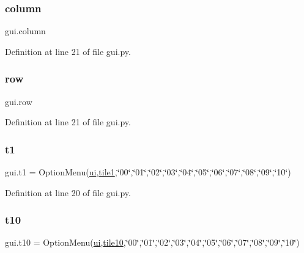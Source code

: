 \subsubsection{\texorpdfstring{column}{column}}
{\footnotesize\ttfamily gui.\+column}



Definition at line 21 of file gui.\+py.

\mbox{\label{namespacegui_a783954bf6031f175ef0ddae4ac1dd3dc}} 
\subsubsection{\texorpdfstring{row}{row}}
{\footnotesize\ttfamily gui.\+row}



Definition at line 21 of file gui.\+py.

\mbox{\label{namespacegui_a4f22ad928dc308fc066844b0a34b8ae7}} 
\subsubsection{\texorpdfstring{t1}{t1}}
{\footnotesize\ttfamily gui.\+t1 = Option\+Menu(\mbox{\hyperlink{namespacegui_a40ab7281456eadbea2dc2038f5c24fa1}{ui}},\mbox{\hyperlink{namespacegui_a50ef8346e02b4fb74cc1f3c01cc5327a}{tile1}},\char`\"{}00\char`\"{},\char`\"{}01\char`\"{},\char`\"{}02\char`\"{},\char`\"{}03\char`\"{},\char`\"{}04\char`\"{},\char`\"{}05\char`\"{},\char`\"{}06\char`\"{},\char`\"{}07\char`\"{},\char`\"{}08\char`\"{},\char`\"{}09\char`\"{},\char`\"{}10\char`\"{})}



Definition at line 20 of file gui.\+py.

\mbox{\label{namespacegui_a2a2149ea486e425f576234cf2094eafc}} 
\subsubsection{\texorpdfstring{t10}{t10}}
{\footnotesize\ttfamily gui.\+t10 = Option\+Menu(\mbox{\hyperlink{namespacegui_a40ab7281456eadbea2dc2038f5c24fa1}{ui}},\mbox{\hyperlink{namespacegui_adea3a4aee4c39cdfa687e806344201e1}{tile10}},\char`\"{}00\char`\"{},\char`\"{}01\char`\"{},\char`\"{}02\char`\"{},\char`\"{}03\char`\"{},\char`\"{}04\char`\"{},\char`\"{}05\char`\"{},\char`\"{}06\char`\"{},\char`\"{}07\char`\"{},\char`\"{}08\char`\"{},\char`\"{}09\char`\"{},\char`\"{}10\char`\"{})}



